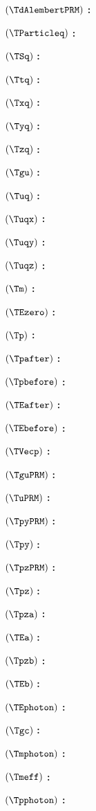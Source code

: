 $( \TdAlembertPRM )$ \textbf{:} \TdAlembertPRMdef

$( \TParticleq )$ \textbf{:} \TParticleqdef

$( \TSq )$ \textbf{:} \TSqdef

$( \Ttq )$ \textbf{:} \Ttqdef

$( \Txq )$ \textbf{:} \Txqdef

$( \Tyq )$ \textbf{:} \Tyqdef

$( \Tzq )$ \textbf{:} \Tzqdef

$( \Tgu )$ \textbf{:} \Tgudef

$( \Tuq )$ \textbf{:} \Tuqdef

$( \Tuqx )$ \textbf{:} \Tuqxdef

$( \Tuqy )$ \textbf{:} \Tuqydef

$( \Tuqz )$ \textbf{:} \Tuqzdef

$( \Tm )$ \textbf{:} \Tmdef

$( \TEzero )$ \textbf{:} \TEzerodef

$( \Tp )$ \textbf{:} \Tpdef

$( \Tpafter )$ \textbf{:} \Tpafterdef

$( \Tpbefore )$ \textbf{:} \Tpbeforedef

$( \TEafter )$ \textbf{:} \TEafterdef

$( \TEbefore )$ \textbf{:} \TEbeforedef

$( \TVecp )$ \textbf{:} \TVecpdef

$( \TguPRM )$ \textbf{:} \TguPRMdef

$( \TuPRM )$ \textbf{:} \TuPRMdef

$( \TpyPRM )$ \textbf{:} \TpyPRMdef

$( \Tpy )$ \textbf{:} \Tpydef

$( \TpzPRM )$ \textbf{:} \TpzPRMdef

$( \Tpz )$ \textbf{:} \Tpzdef

$( \Tpza )$ \textbf{:} \Tpzadef

$( \TEa )$ \textbf{:} \TEadef

$( \Tpzb )$ \textbf{:} \Tpzbdef

$( \TEb )$ \textbf{:} \TEbdef

$( \TEphoton )$ \textbf{:} \TEphotondef

$( \Tgc )$ \textbf{:} \Tgcdef

$( \Tmphoton )$ \textbf{:} \Tmphotondef

$( \Tmeff )$ \textbf{:} \Tmeffdef

$( \Tpphoton )$ \textbf{:} \Tpphotondef

